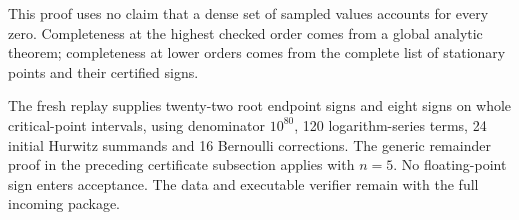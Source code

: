 This proof uses no claim that a dense set of sampled values accounts for
every zero.  Completeness at the highest checked order comes from a
global analytic theorem; completeness at lower orders comes from the
complete list of stationary points and their certified signs.


The fresh replay supplies twenty-two root endpoint signs and eight signs
on whole critical-point intervals, using denominator $10^{80}$, 120
logarithm-series terms, 24 initial Hurwitz summands and 16 Bernoulli
corrections. The generic remainder proof in the preceding certificate
subsection applies with $n=5$. No floating-point sign enters acceptance.
The data and executable verifier remain with the full incoming package.
